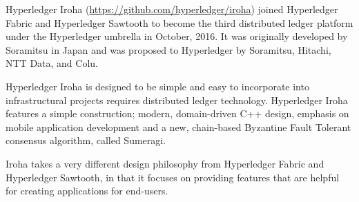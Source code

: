 Hyperledger Iroha (\url{https://github.com/hyperledger/iroha}) joined Hyperledger Fabric and Hyperledger Sawtooth to become the third distributed ledger platform under the Hyperledger umbrella in October, 2016. It was originally developed by Soramitsu in Japan and was proposed to Hyperledger by Soramitsu, Hitachi, NTT Data, and Colu.

Hyperledger Iroha is designed to be simple and easy to incorporate into infrastructural projects requires distributed ledger technology. Hyperledger Iroha features a simple construction; modern, domain-driven C++ design, emphasis on mobile application development and a new, chain-based Byzantine Fault Tolerant consensus algorithm, called Sumeragi. 

Iroha takes a very different design philosophy from Hyperledger Fabric and Hyperledger Sawtooth, in that it focuses on providing features that are helpful for creating applications for end-users. 
